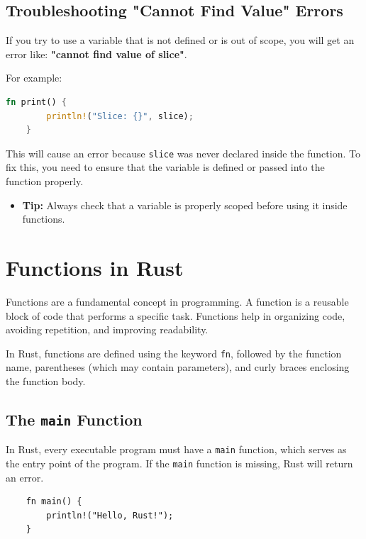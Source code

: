 \documentclass[a4paper,12pt]{report}
\begin{document}
\subsection*{Troubleshooting "Cannot Find Value" Errors}
If you try to use a variable that is not defined or is out of scope, you will get an error like:  
\textbf{"cannot find value of slice"}.

For example:

\begin{lstlisting}[language=Rust]
	fn print() {
		println!("Slice: {}", slice);
	}
\end{lstlisting}

	\noindent This will cause an error because \texttt{slice} was never declared inside the function. To fix this, you need to ensure that the variable is defined or passed into the function properly.

\begin{itemize}
	\item \textbf{Tip:} Always check that a variable is properly scoped before using it inside functions.
\end{itemize}

	
	
	
\section{Functions in Rust}

Functions are a fundamental concept in programming. A function is a reusable block of code that performs a specific task. Functions help in organizing code, avoiding repetition, and improving readability.

	\noindent In Rust, functions are defined using the keyword \texttt{fn}, followed by the function name, parentheses (which may contain parameters), and curly braces enclosing the function body.

\subsection*{The \texttt{main} Function}

In Rust, every executable program must have a \texttt{main} function, which serves as the entry point of the program. If the \texttt{main} function is missing, Rust will return an error.

\begin{lstlisting}
	fn main() {
		println!("Hello, Rust!");
	}
\end{lstlisting}
\end{document}
